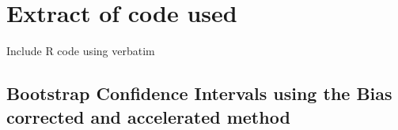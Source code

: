 \chapter{Extract of code used}
\label{A3:code}
 \graphicspath{{Appendix3/Appendix3Figs/PNG/}{Appendix3/Appendix3Figs/PDF/}{Appendix3/Appendix3Figs/}}

Include R code using verbatim


\section[Bootstrap confidence intervals using BCa]{Bootstrap Confidence Intervals using the Bias corrected and accelerated method}   %
\label{code:BCa}
\tiny				%
